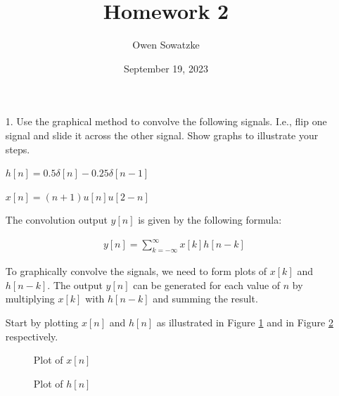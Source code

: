 \documentclass[fleqn]{article}
\title{Homework 2}
\author{Owen Sowatzke}
\date{September 19, 2023}
\begin{document}
	\setlength{\abovedisplayskip}{0pt}
	\setlength{\belowdisplayskip}{0pt}
	\setlength{\abovedisplayshortskip}{0pt}
	\setlength{\belowdisplayshortskip}{0pt}
	\setlength{\mathindent}{0pt}
	\doublespacing
	\maketitle
	
	\begin{enumerate}[nolistsep]
		\item[1.] Use the graphical method to convolve the following signals. I.e., flip one signal and slide it across the other signal. Show graphs to illustrate your steps.
		
		$h[n] = 0.5\delta[n] - 0.25\delta[n-1]$
		
		$x[n] = (n+1)u[n]u[2-n]$
		
		The convolution output $y[n]$ is given by the following formula:
		
		\begin{align*}
			y[n] = \sum_{k=-\infty}^{\infty}{x[k]h[n-k]}
		\end{align*}
		
		To graphically convolve the signals, we need to form plots of $x[k]$ and \newline $h[n-k]$. The output $y[n]$ can be generated for each value of $n$ by multiplying $x[k]$ with $h[n-k]$ and summing the result.
		
		Start by plotting $x[n]$ and $h[n]$ as illustrated in Figure \ref{prob1_xn_plot} and in Figure \ref{prob1_hn_plot} respectively.
		
		\begin{figure}[H]				
			\centerline{}
			\caption{Plot of $x[n]$}
			\label{prob1_xn_plot}
		\end{figure}
		
		\begin{figure}[H]				
			\centerline{}
			\caption{Plot of $h[n]$}
			\label{prob1_hn_plot}
		\end{figure}
		

\end{enumerate}
\end{document}

